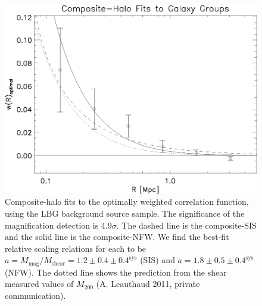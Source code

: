 


\begin{figure}
\begin{center}
\includegraphics[scale=1.0]{plots_ch2/wopt_CompositeHaloFits_44x_LFam1_aveErr07magcut.eps}
\caption[Optimally-Weighted Cross-Correlation]{Composite-halo fits to the optimally weighted correlation function, using the \ac{LBG} background source sample. The significance of the magnification detection is 4.9$\sigma$. The dashed line is the composite-\ac{SIS} and the solid line is the composite-\ac{NFW}.  We find the best-fit relative scaling relations for each to be $a= M_{\text{mag}}/M_{\text{shear}}= 1.2 \pm 0.4 \pm 0.4^{\text{sys}}$ (\ac{SIS}) and $a= 1.8 \pm 0.5 \pm 0.4^{\text{sys}}$ (\ac{NFW}). The dotted line shows the prediction from the shear measured values of $M_{200}$ (A. Leauthaud 2011, private communication).}
\label{plot:multihalo2}
\end{center}
\end{figure}


